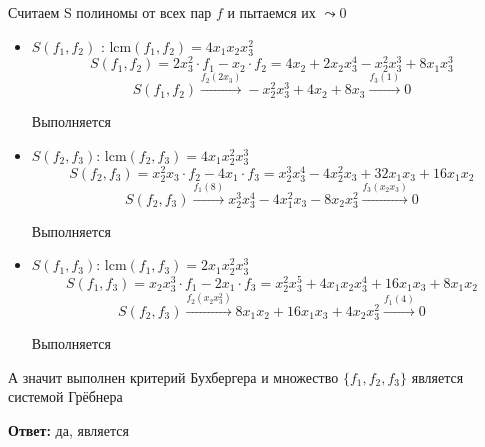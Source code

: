 \documentclass[a4paper,12pt]{article}
\begin{document}
Считаем S полиномы от всех пар $f$ и пытаемся их $\leadsto 0$
\begin{itemize}
\item $S(f_1, f_2)$ : lcm$(f_1, f_2) = 4x_1x_2x_3^2$ 
\[
S(f_1, f_2) = 2x_3^2 \cdot f_1- x_2 \cdot f_2 = 4x_2  + 2x_2x_3^4 - x_2^2x_3^3 + 8x_1x_3^3 
\]
\[
S(f_1, f_2) \overset{f_2 (2x_3)}{\rightarrow} -x_2^2x_3^3 + 4x_2 + 8x_3 \overset{f_3 (1)}{\rightarrow} 0
\]
\begin{center}
Выполняется
\end{center}
\item $S(f_2, f_3)$:  lcm$(f_2, f_3) = 4x_1x_2^2x_3^3$ 
\[
S(f_2, f_3) = x_2^2x_3 \cdot f_2 - 4x_1 \cdot f_3 = x_2^3x_3^4 - 4x_2^2x_3 + 32x_1x_3 +16 x_1x_2
\]
\[
S(f_2, f_3) \overset{f_1 (8)}{\rightarrow} x_2^3x_3^4 - 4x_1^2 x_3 - 8x_2x_3^2 \overset{f_3 (x_2x_3)}{\rightarrow} 0
\]
\begin{center}
Выполняется
\end{center}
\item $S(f_1, f_3)$:  lcm$(f_1, f_3) = 2x_1x_2^2x_3^3$ 
\[
S(f_1, f_3) = x_2x_3^3 \cdot f_1 - 2x_1 \cdot f_3 = x_2^2x_3^5 +4x_1x_2x_3^4 + 16x_1x_3 + 8x_1x_2
\]
\[
S(f_2, f_3) \overset{f_2 (x_2x_3^2)}{\rightarrow} 8x_1x_2 + 16x_1x_3 + 4x_2x_3^2 \overset{f_1 (4)}{\rightarrow} 0 
\]
\begin{center}
Выполняется
\end{center}
\end{itemize}
А значит выполнен критерий Бухбергера и множество $\{f_1, f_2, f_3\}$ является системой Грёбнера
\begin{center}
\textbf{Ответ: } да, является
\end{center}
\end{document}
